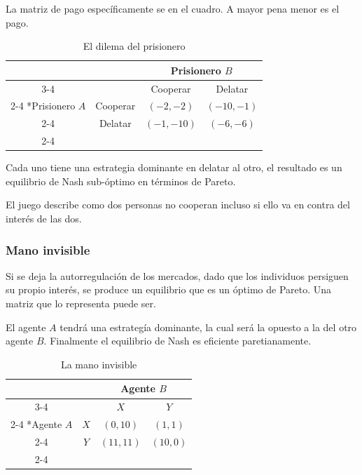 La matriz de pago específicamente se en el cuadro. A mayor pena menor es el pago. 

\begin{table}[!htbp]
    \centering
    \caption{El dilema del prisionero}
    \setlength{\extrarowheight}{2pt}
    \begin{tabular}{*{4}{c|}}
      \multicolumn{2}{c}{} & \multicolumn{2}{c}{Prisionero $B$}\\\cline{3-4}
      \multicolumn{1}{c}{} &  & Cooperar  & Delatar \\\cline{2-4}
      \multirow{2}*{Prisionero $A$}  & Cooperar & $(-2,-2)$ & $(-10,-1)$ \\\cline{2-4}
      & Delatar & $(-1,-10)$ & $(-6,-6)$ \\\cline{2-4}
    \end{tabular}
  \end{table}

Cada uno tiene una estrategia dominante en delatar al otro, el resultado es un equilibrio de Nash sub-óptimo en términos de Pareto. 

El juego describe como dos personas no cooperan incluso si ello va en contra del interés de las dos. 

\subsubsection*{Mano invisible}

Si se deja la autorregulación de los mercados, dado que los individuos persiguen su propio interés, se produce un equilibrio que es un óptimo de Pareto. Una matriz que lo representa puede ser.

El agente $A$ tendrá una estrategía dominante, la cual será la opuesto a la del otro agente $B$. Finalmente el equilibrio de Nash es eficiente paretianamente.

\begin{table}[!htbp]
    \centering
    \caption{La mano invisible}
    \setlength{\extrarowheight}{2pt}
    \begin{tabular}{*{4}{c|}}
      \multicolumn{2}{c}{} & \multicolumn{2}{c}{Agente $B$}\\\cline{3-4}
      \multicolumn{1}{c}{} &  & $X$  & $Y$ \\\cline{2-4}
      \multirow{2}*{Agente $A$}  & $X$ & $(0,10)$ & $(1,1)$ \\\cline{2-4}
      & $Y$ & $(11,11)$ & $(10,0)$ \\\cline{2-4}
    \end{tabular}
  \end{table}

